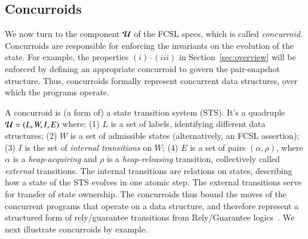 \subsection{Concurroids}
\label{sec:concurroids}

We now turn to the component $\mathcal{U}$ of the FCSL specs, which is
called \emph{concurroid}. Concurroids are responsible for enforcing
the invariants on the evolution of the state. For example, the
properties $(i)${--}$(iii)$ in Section~\ref{sec:overview} will be
enforced by defining an appropriate concurroid to govern the
pair-snapshot structure. Thus, concurroids formally represent
concurrent data structures, over which the programs operate.

A concurroid is (a form of) a state transition system (STS). It's a
quadruple $\mathcal{U} = ({L}, W, I, {E})$ where: (1) $L$ is a set of
labels, identifying different data structures; (2) $W$ is a set of
admissible states (alternatively, an FCSL assertion); (3) $I$ is the
set of \emph{internal transitions} on $W$; (4) $E$ is a set of pairs
$(\alpha, \rho)$, where $\alpha$ is a \emph{heap-acquiring} and $\rho$
is a \emph{heap-releasing} transition, collectively called
\emph{external} transitions. The internal transitions are relations on
states, describing how a state of the STS evolves in one atomic
step. The external transitions serve for transfer of state
ownership. The concurroids thus bound the moves of the concurrent
programs that operate on a data structure, and therefore represent a
structured form of rely/guarantee transitions from Rely/Guarantee
logics~\cite{Feng-al:ESOP07,Vafeiadis:PhD,Jones:IFIP83,Feng:POPL09,Vafeiadis-Parkinson:CONCUR07}. We
next illustrate concurroids by example.

